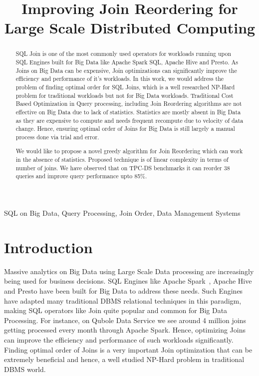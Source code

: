 \documentclass[conference]{IEEEtran}
\begin{document}
\title{Improving Join Reordering for Large Scale Distributed Computing\\
}

\author{
\and
{}
}

\maketitle

\begin{abstract}
 SQL Join is one of the most commonly used operators for workloads running upon SQL Engines built for Big Data like Apache Spark SQL, Apache Hive and Presto. As Joins on Big Data can be expensive, Join optimizations can significantly improve the efficiency and performance of it's workloads. In this work, we would address the problem of finding optimal order for SQL Joins, which is a well researched NP-Hard problem for traditional workloads but not for Big Data workloads. Traditional Cost Based Optimization in Query processing, including Join Reordering algorithms are not effective on Big Data due to lack of statistics. Statistics are mostly absent in Big Data as they are expensive to compute and needs frequent recompute due to velocity of data change. Hence, ensuring optimal order of Joins for Big Data is still largely a manual process done via trial and error.

We would like to propose a novel greedy algorithm for Join Reordering which can work in the absence of statistics. Proposed technique is of linear complexity in terms of number of joins. We have observed that on TPC-DS benchmarks it can reorder 38 queries and improve query performance upto 85\%.
\end{abstract}

\begin{IEEEkeywords}
SQL on Big Data, Query Processing, Join Order, Data Management Systems
\end{IEEEkeywords}

\section{Introduction}
\label{sec:intro} 
Massive analytics on Big Data using Large Scale Data processing are increasingly being used for business decisions. SQL Engines like Apache Spark~\cite{b9}, Apache Hive~\cite{b10} and Presto have been built for Big Data to address these needs. Such Engines have adapted many traditional DBMS relational techniques in this paradigm, making SQL operators like Join quite popular and common for Big Data Processing. For instance, on Qubole Data Service we see around 4 million joins getting processed every month through Apache Spark. Hence, optimizing Joins can improve the efficiency and performance of such workloads significantly. Finding optimal order of Joins is a very important Join optimization that can be extremely beneficial and hence, a well studied NP-Hard problem in traditional DBMS world.
\end{document}
